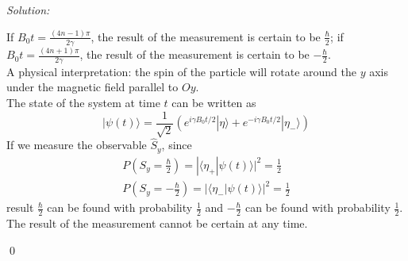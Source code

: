 \documentclass[12pt,a4paper]{article}
\newenvironment{sol}
    {\emph{Solution:}
    }
    {
    \qed
    }
\begin{document}
\begin{sol}
\begin{itemize}
If $B_0t=\frac{(4n-1)\pi}{2\gamma}$, the result of the measurement is certain to be $\frac{\hbar}{2}$; if $B_0t=\frac{(4n+1)\pi}{2\gamma}$, the result of the measurement is certain to be $-\frac{\hbar}{2}$.\\
A physical interpretation: the spin of the particle will rotate around the $y$ axis under the magnetic field parallel to $Oy$.\\
The state of the system at time $t$ can be written as
\begin{equation}
|\psi(t)\rangle=\frac{1}{\sqrt{2}}(e^{i\gamma B_0t/2}|\eta\rangle+e^{-i\gamma B_0t/2}|\eta_-\rangle)
\end{equation}
If we measure the observable $\hat{S}_y$, since
\begin{gather}
P(S_y=\frac{\hbar}{2})=|\langle\eta_+|\psi(t)\rangle|^2=\frac{1}{2}\\
P(S_y=-\frac{\hbar}{2})=|\langle\eta_-|\psi(t)\rangle|^2=\frac{1}{2}
\end{gather}
result $\frac{\hbar}{2}$ can be found with probability $\frac{1}{2}$ and $-\frac{\hbar}{2}$ can be found with probability $\frac{1}{2}$.\\
The result of the measurement cannot be certain at any time.
\end{itemize}
\end{sol}
\end{document}
